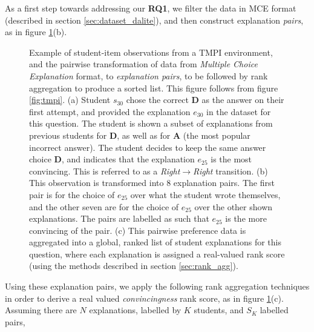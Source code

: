 \documentclass[notitlepage,12pt]{jedm}
\begin{document}
As a first step towards addressing our \textbf{RQ1}, we filter the data in MCE 
format (described in section \ref{sec:dataset_dalite}), and then construct 
explanation \textit{pairs}, as in figure \ref{fig:make_pairs_a}(b).

\begin{figure}[H]
	\centering
	\def\svgscale{0.40}
	
	\caption{
	Example of student-item observations from a TMPI environment, and the 
	pairwise transformation of data from \textit{Multiple Choice Explanation} 
	format, to \textit{explanation pairs}, to be followed by rank aggregation 
	to produce a sorted list. 
	This figure follows from figure \protect\ref{fig:tmpi}.
	(a) Student $s_{30}$ chose the correct \textbf{D} as the answer on 
	their first attempt, and provided the explanation $e_{30}$ in the 
	dataset for this question. 
	The student is shown a subset of explanations from previous students for 
	\textbf{D}, as well as for \textbf{A} (the most popular incorrect 
	answer). 
	The student decides to keep the same answer choice \textbf{D}, and 
	indicates that the explanation $e_{25}$ is the most convincing.
	This is referred to as a \textit{Right}$\rightarrow$\textit{Right} 
	transition.
	(b) This observation is transformed into 8 explanation pairs. The first 
	pair is for the choice of $e_{25}$ over what the student wrote themselves, 
	and the other seven are for the choice of $e_{25}$ over the other shown 
	explanations. 
	The pairs are labelled as such that $e_{25}$ is the more convincing of the 
	pair. 
	(c) This pairwise preference data is aggregated into a global, ranked list 
	of student explanations for this question, where each explanation is 
	assigned a real-valued rank score (using the methods described in section 
	\protect\ref{sec:rank_agg}).
}
\label{fig:make_pairs_a}
\end{figure}

Using these explanation pairs, we apply the following rank aggregation 
techniques in order to derive a real valued \textit{convincingness} rank score, 
as in figure \ref{fig:make_pairs_a}(c).
Assuming there are $N$ explanations, labelled by $K$ students, and $S_K$ 
labelled pairs,
\end{document}
